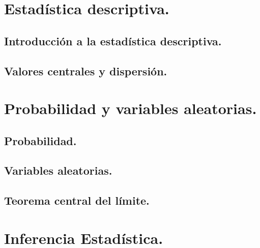 \documentclass[10pt,a4paper]{book}
\begin{document}
\pagestyle{empty}
\newpage


\mainmatter

\part{Estadística descriptiva.}
\label{parte:EstadisticaDescriptiva}

\pagestyle{plain}



\chapter{Introducción a la estadística descriptiva.}
\label{cap:IntroduccionEstadisticaDescriptiva}


\chapter{Valores centrales y dispersión.}
\label{cap:ValoresCentralesDispersion}


\part{Probabilidad y variables aleatorias.}
\label{parte:ProbabilidadVariablesAleatorias}


\chapter{Probabilidad.}
\label{cap:Probabilidad}


\chapter{Variables aleatorias.}
\label{cap:VariablesAleatorias}


\chapter{Teorema central del límite.}
\label{cap:TeoremaCentralLimite}



\part{Inferencia Estadística.}
\label{parte:InferenciaEstadistica}

\end{document}
